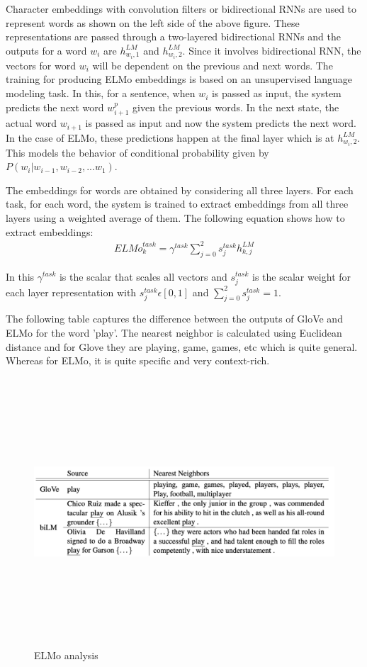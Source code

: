 \documentclass[a4paper, 11pt]{article}
\begin{document}
Character embeddings with convolution filters or bidirectional RNNs are used to represent words as shown on the left side of the above figure. These representations are passed through a two-layered bidirectional RNNs and the outputs for a word $w_i$ are $h^{LM}_{w_{i},1}$ and $h^{LM}_{w_{i},2}$. Since it involves bidirectional RNN, the vectors for word $w_i$ will be dependent on the previous and next words. The training for producing ELMo embeddings is based on an unsupervised language modeling task. In this, for a sentence,  when $w_i$ is passed as input, the system predicts the next word $w^p_{i+1}$ given the previous words. In the next state, the actual word $w_{i+1}$ is passed as input and now the system predicts the next word. In the case of ELMo, these predictions happen at the final layer which is at $h^{LM}_{w_{i},2}$. This models the behavior of conditional probability given by $P(w_i|w_ {i-1},w_{i-2},...w_1)$.

The embeddings for words are obtained by considering all three layers. For each task, for each word, the system is trained to extract embeddings from all three layers using a weighted average of them. The following equation shows how to extract embeddings:
\begin{align*} 
{ELMo}^{task}_k = \gamma^{task} \sum_{j=0}^{2} s^{task}_j h^{LM}_{k,j}
\end{align*}

In this $\gamma^{task}$ is the scalar that scales all vectors and $s^{task}_j$ is the scalar weight for each layer representation with $s^{task}_j \epsilon [0,1]$ and $\sum_{j=0}^{2} s^{task}_j = 1$. 

The following table captures the difference between the outputs of GloVe and ELMo for the word 'play'. The nearest neighbor is calculated using Euclidean distance and for Glove they are playing, game, games, etc which is quite general. Whereas for ELMo, it is quite specific and very context-rich. 

\begin{figure}[H]
    \centering
    \includegraphics[width=\textwidth,height=10cm,keepaspectratio=true]
    {elmo-2.png}
    \caption{
        ELMo analysis \parencite{GerElmo}
    }
    \label{fig:ELMO2}
\end{figure}
\pagebreak
\end{document}
